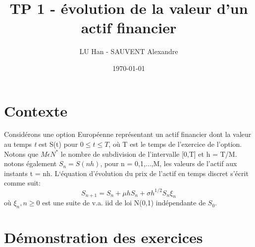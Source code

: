\documentclass[a4paper,10pt]{report}
\title{TP 1 - évolution de la valeur d'un actif financier}
\author{LU Han - SAUVENT Alexandre}
\date{\today}
\begin{document}
\renewcommand{\labelitemi}{\large\textcolor{tatoebagreen}{\fg}}
\groovypdtitre
\restoregeometry %


\tableofcontents


\chapter{Contexte}
\noindent Considérons une option Européenne représentant un actif financier dont la valeur au temps \emph{t} est S(t) pour $0 \leq t \leq T$, où T est le temps de l'exercice de l'option. Notons que $M \epsilon N^{\ast}$ le nombre de subdivision de l'intervalle [0,T] et h = T/M. notons également $S_{n} = S(nh)$, pour n = 0,1,...,M, les valeurs de l'actif aux instants t = nh.
L‘équation d'évolution du prix de l'actif en temps discret s'écrit comme suit:
\begin{equation}
S_{n+1} = S_{n} + \mu h S_{n} + \sigma h^{1/2} S_{n} \xi_{n}   
\end{equation} 
où $\xi_{n}, n \geq 0$ est une suite de v.a. iid de loi N(0,1) indépendante de $S_{0}$. 

\chapter{Démonstration des exercices}
\end{document}
